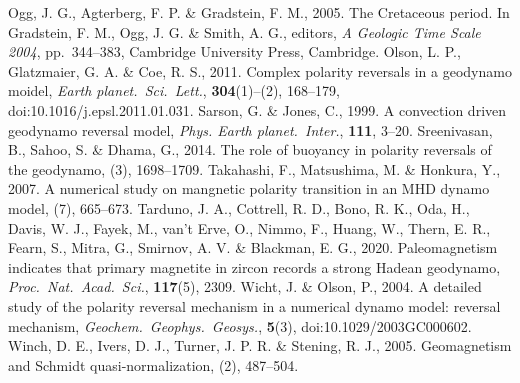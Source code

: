 \begin{thebibliography}{}
Ogg, J. G., Agterberg, F. P. \& Gradstein, F. M., 2005. The Cretaceous period. In Gradstein, F. M., Ogg, J. G. \& Smith, A. G., editors, {\it A Geologic Time Scale 2004}, pp.\ 344--383, Cambridge University Press, Cambridge.
%
Olson, L. P., Glatzmaier, G. A. \& Coe, R. S., 2011. Complex polarity reversals in a geodynamo moidel, {\it Earth planet.\ Sci.\ Lett.}, {\bf 304}(1)--(2), 168--179, doi:10.1016/j.epsl.2011.01.031.
%
Sarson, G. \& Jones, C., 1999. A convection driven geodynamo reversal model, {\it Phys. Earth planet.\ Inter.}, {\bf 111}, 3--20.
%
Sreenivasan, B., Sahoo, S. \& Dhama, G., 2014. The role of buoyancy in polarity reversals of the geodynamo, (3), 1698--1709.
%
Takahashi, F., Matsushima, M. \& Honkura, Y., 2007. A numerical study on mangnetic polarity transition in an MHD dynamo model, (7), 665--673.
%
Tarduno, J. A., Cottrell, R. D., Bono, R. K., Oda, H., Davis, W. J., Fayek, M., van't Erve, O., Nimmo, F., Huang, W., Thern, E. R., Fearn, S., Mitra, G., Smirnov, A. V. \& Blackman, E. G., 2020. Paleomagnetism indicates that primary magnetite in zircon records a strong Hadean geodynamo, {\it Proc.\ Nat.\ Acad.\ Sci.}, {\bf 117}(5), 2309.
%
Wicht, J. \& Olson, P., 2004. A detailed study of the polarity reversal mechanism in a numerical dynamo model: reversal mechanism, {\it Geochem.\ Geophys.\ Geosys.}, {\bf 5}(3), doi:10.1029/2003GC000602.
%
Winch, D. E., Ivers, D. J., Turner, J. P. R. \& Stening, R. J., 2005. Geomagnetism and Schmidt quasi-normalization, (2), 487--504.
%
\end{thebibliography}